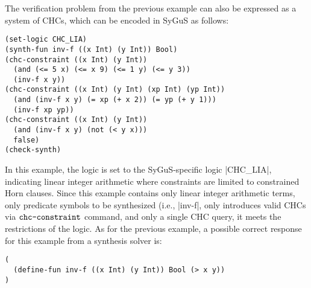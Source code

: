 \documentclass[english,a4paper,10pt]{article}
\begin{document}
\begin{example}
The verification problem from the previous example can also be expressed as a system of CHCs,
which can be encoded in SyGuS as follows:
\begin{lstlisting}[language=SyGuS]
(set-logic CHC_LIA)
(synth-fun inv-f ((x Int) (y Int)) Bool)
(chc-constraint ((x Int) (y Int))
  (and (<= 5 x) (<= x 9) (<= 1 y) (<= y 3))
  (inv-f x y))
(chc-constraint ((x Int) (y Int) (xp Int) (yp Int))
  (and (inv-f x y) (= xp (+ x 2)) (= yp (+ y 1)))
  (inv-f xp yp))
(chc-constraint ((x Int) (y Int))
  (and (inv-f x y) (not (< y x)))
  false)
(check-synth)
\end{lstlisting}
In this example, the logic is set to the SyGuS-specific logic
\code|CHC_LIA|, indicating linear integer arithmetic
where constraints are limited to constrained Horn clauses.
Since this example contains only linear integer arithmetic terms,
only predicate symbols to be synthesized (i.e., \code|inv-f|,
only introduces valid CHCs via $\texttt{chc-constraint}$ command, and
only a single CHC query,
it meets the restrictions of the logic.
As for the previous example, a possible correct response for this example from a synthesis solver is:
\begin{lstlisting}[language=SyGuS]
(
  (define-fun inv-f ((x Int) (y Int)) Bool (> x y))
)
\end{lstlisting}
\end{example}
\end{document}

